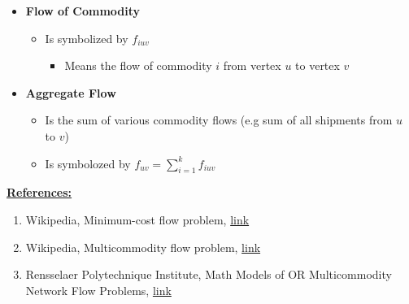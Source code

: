 \documentclass[12pt]{article}
\begin{document}
\begin{enumerate}[1.]
\begin{itemize}
        \item \textbf{Flow of Commodity}

        \begin{itemize}
            \item Is symbolized by $f_{iuv}$
            \begin{itemize}
                \item Means the flow of commodity $i$ from vertex $u$ to vertex $v$
            \end{itemize}
        \end{itemize}

        \item \textbf{Aggregate Flow}

        \begin{itemize}
            \item Is the sum of various commodity flows (e.g sum of all shipments from $u$ to $v$)
            \item Is symbolozed by $f_{uv} = \sum\limits_{i = 1}^k f_{iuv}$
        \end{itemize}

    \end{itemize}

    \bigskip

    \underline{\textbf{References:}}

    \begin{enumerate}[1)]
        \item Wikipedia, Minimum-cost flow problem, \href{https://en.wikipedia.org/wiki/Minimum-cost_flow_problem}{link}
        \item Wikipedia, Multicommodity flow problem, \href{https://en.wikipedia.org/wiki/Multi-commodity_flow_problem}{link}
        \item Rensselaer Polytechnique Institute, Math Models of OR Multicommodity Network Flow Problems, \href{http://eaton.math.rpi.edu/faculty/Mitchell/courses/matp4700/notesMATP4700/lecture18/18B_multicommoditybeamer.pdf}{link}
    \end{enumerate}

\end{enumerate}
\end{document}
